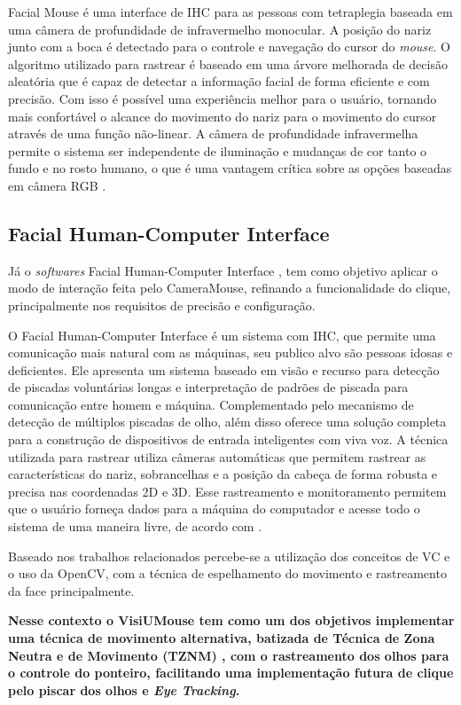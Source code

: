 Facial Mouse é uma interface de IHC para as pessoas com tetraplegia baseada em uma câmera de profundidade de infravermelho monocular. A posição do nariz junto com a boca é detectado para o controle e navegação do cursor do \textit{mouse}. O algoritmo utilizado para rastrear é baseado em uma árvore melhorada de decisão aleatória que é capaz de detectar a informação facial de forma eficiente e com precisão. Com isso é possível uma experiência melhor para o usuário, tornando mais confortável o alcance do movimento do nariz para o movimento do cursor através de uma função não-linear. A câmera de profundidade infravermelha permite o sistema ser independente de iluminação e mudanças de cor tanto o fundo e no rosto humano, o que é uma vantagem crítica sobre as opções baseadas em câmera RGB .

\subsection{Facial Human-Computer Interface}
Já o \textit{softwares} Facial Human-Computer Interface , tem como objetivo aplicar o modo de interação feita pelo CameraMouse, refinando a funcionalidade do clique, principalmente nos requisitos de precisão e configuração.

O Facial Human-Computer Interface é um sistema com IHC, que permite uma comunicação mais natural com as máquinas, seu publico alvo são pessoas idosas e deficientes. Ele apresenta um sistema baseado em visão e recurso para detecção de piscadas voluntárias longas e interpretação de padrões de piscada para comunicação entre homem e máquina. Complementado pelo mecanismo de detecção de múltiplos piscadas de olho, além disso oferece uma solução completa para a construção de dispositivos de entrada inteligentes com viva voz. A técnica utilizada para rastrear utiliza câmeras automáticas que permitem rastrear as características do nariz, sobrancelhas e a posição da cabeça de forma robusta e precisa nas coordenadas 2D e 3D. Esse rastreamento e monitoramento permitem que o usuário forneça dados para a máquina do computador e acesse todo o sistema de uma maneira livre, de acordo com . 

Baseado nos trabalhos relacionados percebe-se a utilização dos conceitos de VC e o uso da OpenCV, com a técnica de espelhamento do movimento e rastreamento da face principalmente. 

\textbf{Nesse contexto o VisiUMouse tem como um dos objetivos implementar uma técnica de movimento alternativa, batizada de Técnica de Zona Neutra e de Movimento (TZNM) , com o rastreamento dos olhos para o controle do ponteiro, facilitando uma implementação futura de clique pelo piscar dos olhos e \textit{Eye Tracking}.}


